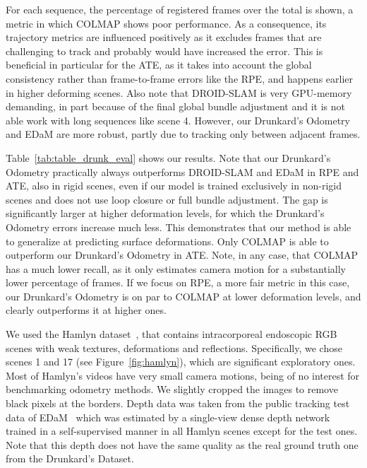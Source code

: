 \documentclass{article}
\newcommand{\boldparagraph}[1]{\vspace{0.0em}\noindent{\bf #1}}
\begin{document}
For each sequence, the percentage of registered frames over the total is shown, a metric in which COLMAP shows poor performance. As a consequence, its trajectory metrics are influenced positively as it excludes frames that are challenging to track and probably would have increased the error. This is beneficial in particular for the ATE, as it takes into account the global consistency rather than frame-to-frame errors like the RPE, and happens earlier in higher deforming scenes. Also note that DROID-SLAM is very GPU-memory demanding, in part because of the final global bundle adjustment and it is not able work with long sequences like scene 4. However, our Drunkard's Odometry and EDaM are more robust, partly due to tracking only between adjacent frames.

Table~\ref{tab:table_drunk_eval} shows our results. Note that our Drunkard's Odometry practically always outperforms DROID-SLAM and EDaM in RPE and ATE, also in rigid scenes, even if our model is trained exclusively in non-rigid scenes and does not use loop closure or full bundle adjustment. 
The gap is significantly larger at higher deformation levels, for which the Drunkard's Odometry errors increase much less. This demonstrates that our method is able to generalize at predicting surface deformations. Only COLMAP is able to outperform our Drunkard's Odometry in ATE. Note, in any case, that COLMAP has a much lower recall, as it only estimates camera motion for a substantially lower percentage of frames. If we focus on RPE, a more fair metric in this case, our Drunkard's Odometry is on par to COLMAP at lower deformation levels, and clearly outperforms it at higher ones. 

 
\boldparagraph{Validation in real endoscopies.}
We used the Hamlyn dataset~\cite{stoyanov2005soft}, that contains intracorporeal endoscopic RGB scenes with weak textures, deformations and reflections. Specifically, we chose scenes 1 and 17 (see Figure~\ref{fig:hamlyn}), which are significant exploratory ones. Most of Hamlyn's videos have very small camera motions, being of no interest for benchmarking odometry methods. We slightly cropped the images to remove black pixels at the borders. Depth data was taken from the public tracking test data of EDaM~\cite{recasens2021endo} which was estimated by a single-view dense depth network trained in a self-supervised manner in all Hamlyn scenes except for the test ones. Note that this depth does not have the same quality as the real ground truth one from the Drunkard's Dataset. 
\end{document}
